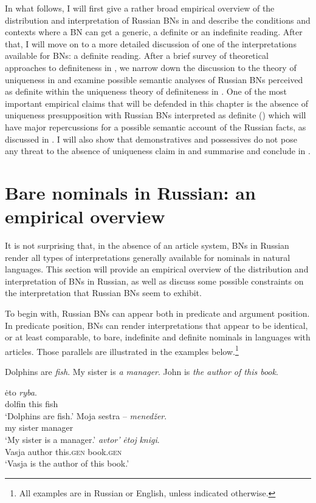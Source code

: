 \documentclass[output=paper,colorlinks,citecolor=brown]{langscibook}
\begin{document}
In what follows, I will first give a rather broad empirical overview of the distribution and interpretation of Russian BNs in  and describe the conditions and contexts where a BN can get a generic, a definite or an indefinite reading. After that, I will move on to a more detailed discussion of one of the interpretations available for BNs: a definite reading. After a brief survey of theoretical approaches to definiteness in , we narrow down the discussion to the theory of uniqueness in  and examine possible semantic analyses of Russian BNs perceived as definite within the uniqueness theory of definiteness in . One of the most important empirical claims that will be defended in this chapter is the absence of uniqueness presupposition with Russian BNs interpreted as definite () which will have major repercussions for a possible semantic account of the Russian facts, as discussed in . I will also show that demonstratives and possessives do not pose any threat to the absence of uniqueness claim in  and summarise and conclude in . 

\section{Bare nominals in Russian: an empirical overview}
\label{overview}

It is not surprising that, in the absence of an article system, BNs in Russian render all types of interpretations generally available for nominals in natural languages. This section will provide an empirical overview of the distribution and interpretation of BNs in Russian, as well as discuss some possible constraints on the interpretation that Russian BNs seem to exhibit. 

To begin with, Russian BNs can appear both in predicate and argument position. In predicate position, BNs can render interpretations that appear to be identical, or at least comparable, to bare, indefinite and definite nominals in languages with articles. Those parallels are illustrated in the examples below.\footnote{All examples are in Russian or English, unless indicated otherwise.}

\ea 
\ea Dolphins are \textit{fish}. 
\ex My sister is \textit{a manager}. 
\ex John is \textit{the author of this book}. 
\z
\z

\ea
\ea
{} \.{e}to \textit{ryba}. \\
dolfin this fish \\
\glt `Dolphins are fish.'
\ex 
\gll Moja {sestra --} \textit{mened\v{z}er}. \\
my sister manager \\
\glt `My sister is a manager.'
\ex 
{} \textit{avtor'} \textit{\.{e}toj} \textit{knigi}. \\
Vasja  author this.\textsc{gen} book.\textsc{gen}\\
\glt `Vasja is the author of this book.'
\z
\z
\end{document}
